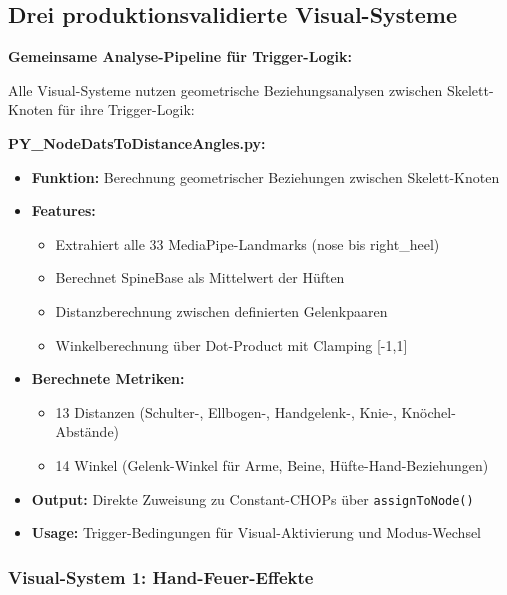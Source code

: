 \newpage

\subsection{Drei produktionsvalidierte Visual-Systeme}

\textbf{Gemeinsame Analyse-Pipeline für Trigger-Logik:}

Alle Visual-Systeme nutzen geometrische Beziehungsanalysen zwischen Skelett-Knoten für ihre Trigger-Logik:

\textbf{PY\_NodeDatsToDistanceAngles.py:}
\begin{itemize}
    \item \textbf{Funktion:} Berechnung geometrischer Beziehungen zwischen Skelett-Knoten
    \item \textbf{Features:}
    \begin{itemize}
        \item Extrahiert alle 33 MediaPipe-Landmarks (nose bis right\_heel)
        \item Berechnet SpineBase als Mittelwert der Hüften
        \item Distanzberechnung zwischen definierten Gelenkpaaren
        \item Winkelberechnung über Dot-Product mit Clamping [-1,1]
    \end{itemize}
    \item \textbf{Berechnete Metriken:}
    \begin{itemize}
        \item 13 Distanzen (Schulter-, Ellbogen-, Handgelenk-, Knie-, Knöchel-Abstände)
        \item 14 Winkel (Gelenk-Winkel für Arme, Beine, Hüfte-Hand-Beziehungen)
    \end{itemize}
    \item \textbf{Output:} Direkte Zuweisung zu Constant-CHOPs über \texttt{assignToNode()}
    \item \textbf{Usage:} Trigger-Bedingungen für Visual-Aktivierung und Modus-Wechsel
\end{itemize}

\subsubsection{Visual-System 1: Hand-Feuer-Effekte}

